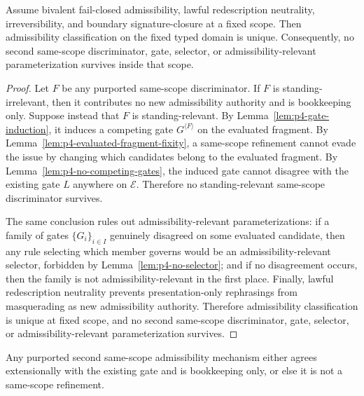 \begin{manualtheorem}
\label{thm:p4-structural-exhaustion-core}
Assume bivalent fail-closed admissibility, lawful redescription neutrality, irreversibility, and boundary signature-closure at a fixed scope. Then admissibility classification on the fixed typed domain is unique. Consequently, no second same-scope discriminator, gate, selector, or admissibility-relevant parameterization survives inside that scope.
\end{manualtheorem}

\begin{proof}
Let $F$ be any purported same-scope discriminator. If $F$ is standing-irrelevant, then it contributes no new admissibility authority and is bookkeeping only. Suppose instead that $F$ is standing-relevant. By Lemma~\ref{lem:p4-gate-induction}, it induces a competing gate $G^{\langle F\rangle}$ on the evaluated fragment. By Lemma~\ref{lem:p4-evaluated-fragment-fixity}, a same-scope refinement cannot evade the issue by changing which candidates belong to the evaluated fragment. By Lemma~\ref{lem:p4-no-competing-gates}, the induced gate cannot disagree with the existing gate $L$ anywhere on $\mathcal E$. Therefore no standing-relevant same-scope discriminator survives.

The same conclusion rules out admissibility-relevant parameterizations: if a family of gates $\{G_i\}_{i\in I}$ genuinely disagreed on some evaluated candidate, then any rule selecting which member governs would be an admissibility-relevant selector, forbidden by Lemma~\ref{lem:p4-no-selector}; and if no disagreement occurs, then the family is not admissibility-relevant in the first place. Finally, lawful redescription neutrality prevents presentation-only rephrasings from masquerading as new admissibility authority. Therefore admissibility classification is unique at fixed scope, and no second same-scope discriminator, gate, selector, or admissibility-relevant parameterization survives.
\end{proof}

\begin{manualcorollary}
\label{cor:p4-closure-logic}
Any purported second same-scope admissibility mechanism either agrees extensionally with the existing gate and is bookkeeping only, or else it is not a same-scope refinement.
\end{manualcorollary}

